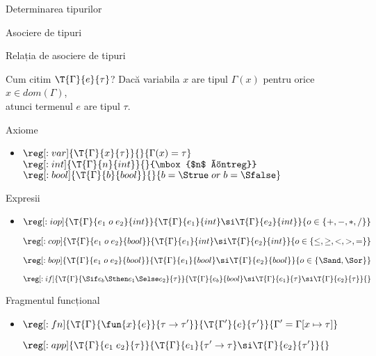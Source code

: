 \documentclass[xcolor=x11names,compress,10pt]{beamer}
\begin{document}
\begin{section}{Determinarea tipurilor}
\begin{subsection}{Asociere de tipuri}
\begin{frame}{Relația de asociere de tipuri}
    \begin{block}{Cum citim $\T{\Gamma}{e}{\tau}$?}
    Dacă variabila $x$ are tipul $\Gamma(x)$ pentru orice $x\in dom(\Gamma)$,\\ atunci termenul $e$ are tipul $\tau$.
    \end{block}
    \end{frame}
    
    \begin{frame}{Axiome}
    \begin{itemize}
    \item[] $\reg[:var]{\T{\Gamma}{x}{\tau}}{}{\Gamma(x) = \tau}$
    \vitem[] $\reg[:int]{\T{\Gamma}{n}{int}}{}{\mbox{$n$ întreg}}$
    \vitem[] $\reg[:bool]{\T{\Gamma}{b}{bool}}{}{b = \Strue \mathrel{or} b = \Sfalse}$
    \end{itemize}
    \end{frame}
    
    
    \begin{frame}
    {Expresii}
    \begin{itemize}
    \item[]
    $\reg[:iop]{\T{\Gamma}{e_1\mathrel{o} e_2}{int}}{\T{\Gamma}{e_1}{int} \si \T{\Gamma}{e_2}{int}}{o\in \{+,-,*,/\}}$
    
    \vitem[]
    $\reg[:cop]{\T{\Gamma}{e_1\mathrel{o} e_2}{bool}}{\T{\Gamma}{e_1}{int} \si \T{\Gamma}{e_2}{int}}{o\in \{\leq, \geq, <, >, =\}}$
    
    \vitem[]
    $\reg[:bop]{\T{\Gamma}{e_1\mathrel{o} e_2}{bool}}{\T{\Gamma}{e_1}{bool} \si \T{\Gamma}{e_2}{bool}}{o\in \{\Sand, \Sor\}}$
    
    \vitem[]
    $\reg[:if]{\T{\Gamma}{\Sif e_b \Sthen e_1 \Selse e_2}{\tau}}{\T{\Gamma}{e_b}{bool} \si \T{\Gamma}{e_1}{\tau} \si \T{\Gamma}{e_2}{\tau}}{}$
    \end{itemize}
    \end{frame}
    
    
    \begin{frame}{Fragmentul funcțional}
    \begin{itemize}
    \item[] 
    $\displaystyle\reg[:fn]{\T{\Gamma}{\fun{x}{e}}{\tau \rightarrow \tau'}}{\T{\Gamma'}{e}{\tau'}}{\Gamma' = \Gamma[x\mapsto \tau]}$
    
    \vitem[]
    $\displaystyle\reg[:app]{\T{\Gamma}{e_1\; e_2}{\tau}}{\T{\Gamma}{e_1}{\tau' \rightarrow \tau} \si \T{\Gamma}{e_2}{\tau'}}{}$
    \end{itemize}
    \end{frame}
    

\end{subsection}
\end{section}
\end{document}
